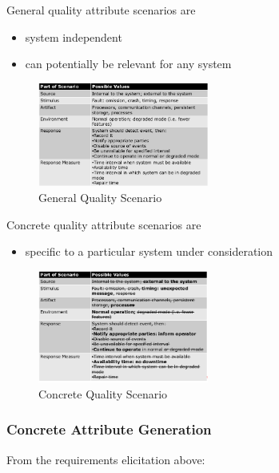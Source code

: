 General quality attribute scenarios are

\begin{itemize}
\tightlist
\item
  system independent
\item
  can potentially be relevant for any system
\end{itemize}

\begin{figure}[H]
\centering
\includegraphics[width=0.5\textwidth]{figures/qualityScenarioGeneral.png}
\caption{General Quality Scenario}
\end{figure}


Concrete quality attribute scenarios are

\begin{itemize}
\tightlist
\item
  specific to a particular system under consideration
\end{itemize}

\begin{figure}[H]
\centering
\includegraphics[width=0.5\textwidth]{figures/qualityScenarioConcrete.png}
\caption{Concrete Quality Scenario}
\end{figure}

\hypertarget{concrete-attribute-generation}{%
\subsubsection{Concrete Attribute
Generation}\label{concrete-attribute-generation}}

From the requirements elicitation above:

